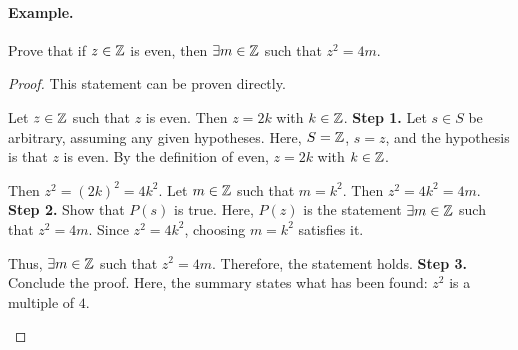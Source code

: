 \paragraph{Example.}
\begin{exercise}{
    Prove that if $z \in \mathbb{Z}$ is even, %
    then $\exists m \in \mathbb{Z}$ such that $z^2 = 4m$.
}
\end{exercise}
\begin{proof}{
    This statement can be proven directly.

    \begin{annotatedpanel}[Setup.]{
        Let $z \in \mathbb{Z}$ such that $z$ is even. %
        Then $z = 2k$ with $k \in \mathbb{Z}$.
    }{
        \textbf{Step 1.} Let $s \in S$ be arbitrary, assuming any given %
        hypotheses. %
        Here, $S = \mathbb{Z}$, $s = z$, and the hypothesis is that $z$ is even. %
        By the definition of even, $z = 2k$ with $k \in \mathbb{Z}$.
    }
    \end{annotatedpanel}

    \begin{annotatedpanel}[Verification.]{
        Then $z^2 = (2k)^2 = 4k^2$. %
        Let $m \in \mathbb{Z}$ such that $m = k^2$. %
        Then $z^2 = 4k^2 = 4m$.
    }{
        \textbf{Step 2.} Show that $P(s)$ is true. %
        Here, $P(z)$ is the statement $\exists m \in \mathbb{Z}$ such that %
        $z^2 = 4m$. %
        Since $z^2 = 4k^2$, choosing $m = k^2$ satisfies it.
    }
    \end{annotatedpanel}

    \begin{annotatedpanel}[Conclusion.]{
        Thus, $\exists m \in \mathbb{Z}$ such that $z^2 = 4m$. %
        Therefore, the statement holds. \qedhere
    }{
        \textbf{Step 3.} Conclude the proof. %
        Here, the summary states what has been found: %
        $z^2$ is a multiple of $4$.
    }
    \end{annotatedpanel}
}
\end{proof}